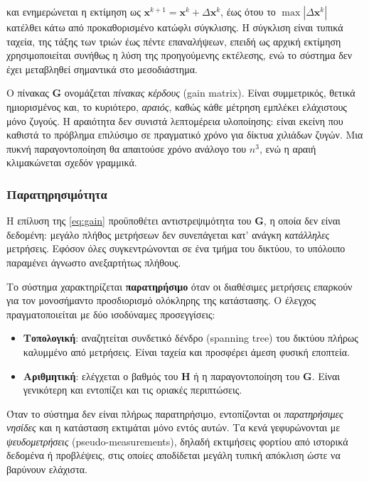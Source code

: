 και ενημερώνεται η εκτίμηση ως $\mathbf{x}^{k+1} = \mathbf{x}^{k} + \Delta \mathbf{x}^{k}$,
έως ότου το $\max|\Delta \mathbf{x}^{k}|$ κατέλθει κάτω από προκαθορισμένο κατώφλι
σύγκλισης. Η σύγκλιση είναι τυπικά ταχεία, της τάξης των τριών έως πέντε επαναλήψεων,
επειδή ως αρχική εκτίμηση χρησιμοποιείται συνήθως η λύση της προηγούμενης εκτέλεσης, ενώ το
σύστημα δεν έχει μεταβληθεί σημαντικά στο μεσοδιάστημα.

Ο πίνακας $\mathbf{G}$ ονομάζεται \emph{πίνακας κέρδους} (gain matrix). Είναι συμμετρικός,
θετικά ημιορισμένος και, το κυριότερο, \emph{αραιός}, καθώς κάθε μέτρηση εμπλέκει ελάχιστους
μόνο ζυγούς. Η αραιότητα δεν συνιστά λεπτομέρεια υλοποίησης: είναι εκείνη που καθιστά το
πρόβλημα επιλύσιμο σε πραγματικό χρόνο για δίκτυα χιλιάδων ζυγών. Μια πυκνή παραγοντοποίηση
θα απαιτούσε χρόνο ανάλογο του $n^3$, ενώ η αραιή κλιμακώνεται σχεδόν γραμμικά.

\subsubsection*{Παρατηρησιμότητα}

Η επίλυση της \eqref{eq:gain} προϋποθέτει αντιστρεψιμότητα του $\mathbf{G}$, η οποία δεν
είναι δεδομένη: μεγάλο πλήθος μετρήσεων δεν συνεπάγεται κατ' ανάγκη \emph{κατάλληλες}
μετρήσεις. Εφόσον όλες συγκεντρώνονται σε ένα τμήμα του δικτύου, το υπόλοιπο παραμένει
άγνωστο ανεξαρτήτως πλήθους.

Το σύστημα χαρακτηρίζεται \textbf{παρατηρήσιμο} όταν οι διαθέσιμες μετρήσεις επαρκούν για
τον μονοσήμαντο προσδιορισμό ολόκληρης της κατάστασης. Ο έλεγχος πραγματοποιείται με δύο
ισοδύναμες προσεγγίσεις:

\begin{itemize}
\item \textbf{Τοπολογική}: αναζητείται συνδετικό δένδρο (spanning tree) του δικτύου πλήρως
      καλυμμένο από μετρήσεις. Είναι ταχεία και προσφέρει άμεση φυσική εποπτεία.
\item \textbf{Αριθμητική}: ελέγχεται ο βαθμός του $\mathbf{H}$ ή η παραγοντοποίηση του
      $\mathbf{G}$. Είναι γενικότερη και εντοπίζει και τις οριακές περιπτώσεις.
\end{itemize}

Όταν το σύστημα δεν είναι πλήρως παρατηρήσιμο, εντοπίζονται οι \emph{παρατηρήσιμες νησίδες}
και η κατάσταση εκτιμάται μόνο εντός αυτών. Τα κενά γεφυρώνονται με \emph{ψευδομετρήσεις}
(pseudo-measurements), δηλαδή εκτιμήσεις φορτίου από ιστορικά δεδομένα ή προβλέψεις, στις
οποίες αποδίδεται μεγάλη τυπική απόκλιση ώστε να βαρύνουν ελάχιστα.

